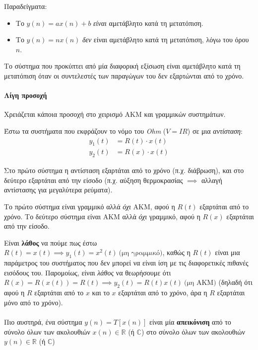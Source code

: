 \documentclass[11pt,a4paper,notitlepage,fleqn,draft]{article}
\begin{document}
Παραδείγματα:
\begin{itemize}
	\item Το \( y(n) = ax(n) + b \) \textit{είναι} αμετάβλητο κατά τη μετατόπιση.
	\item Το \( y(n) = nx(n) \) \textit{δεν} είναι αμετάβλητο κατά τη μετατόπιση, λόγω του όρου \( n \).
\end{itemize}

Το σύστημα που προκύπτει από μία διαφορική εξίσωση είναι αμετάβλητο κατά τη μετατόπιση όταν οι συντελεστές των παραγώγων του δεν εξαρτώνται από το χρόνο.

\paragraph{Λίγη προσοχή}
Χρειάζεται κάποια προσοχή στο χειρισμό ΑΚΜ και γραμμικών συστημάτων.

Έστω τα συστήματα που εκφράζουν το νόμο του \emph{Ohm} (\( V=IR \)) σε μια \emph{αντίσταση}:
\begin{align*}
	y_1(t) &= R(t) \cdot x(t)\\
	y_2(t) &= R(x) \cdot x(t)
\end{align*}

Στο πρώτο σύστημα η αντίσταση εξαρτάται από το χρόνο (π.χ. διάβρωση), και στο δεύτερο εξαρτάται από την είσοδο (π.χ. αύξηση θερμοκρασίας \( \implies \) αλλαγή αντίστασης για μεγαλύτερα ρεύματα).

Το πρώτο σύστημα είναι γραμμικό αλλά \emph{όχι} ΑΚΜ, αφού η \( R(t) \) εξαρτάται από το χρόνο.
Το δεύτερο σύστημα είναι ΑΚΜ αλλά \emph{όχι} γραμμικό, αφού η \( R(x) \) εξαρτάται από την είσοδο.

Είναι \textbf{λάθος} να πούμε πως έστω \( R(t)=x(t) \implies y_1(t)=x^2(t)\ \text{(μη γραμμικό)} \), καθώς
η \( R(t) \) είναι μια παράμετρος του συστήματος που δεν μπορεί να είναι ίση με τις διαφορετικές πιθανές
εισόδους του. Παρομοίως, είναι \emph{λάθος} να θεωρήσουμε ότι \( R(x) = R(x(t)) = R(t) \implies y_2(t) = R(t)x(t) \ \text{(μη ΑΚΜ)} \) (δηλαδή ότι αφού η \( R \) εξαρτάται από το \( x \) και το \( x \) εξαρτάται από το χρόνο, άρα η \( R \) εξαρτάται μόνο από το χρόνο).


\paragraph{}
Πιο αυστηρά, ένα σύστημα \( y(n) = T\left[x(n)\right] \) είναι μία \textbf{απεικόνιση}
από το σύνολο όλων των ακολουθιών \( x(n) \in \mathbb R \) (ή \( \mathbb C \))
στο σύνολο όλων των ακολουθιών \( y(n) \in \mathbb R  \) (ή \( \mathbb{C} \))
\end{document}
